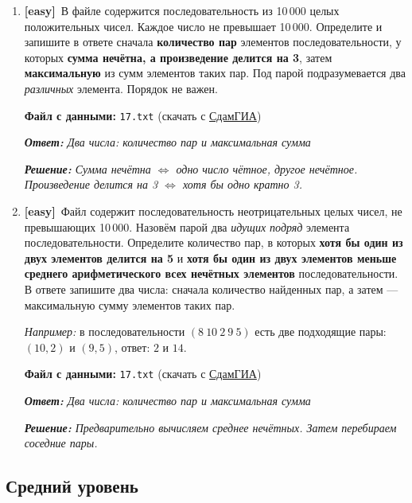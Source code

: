 \documentclass[a4paper]{article}
\newcommand{\easytag}{\textcolor{easycolor}{\textbf{[easy]}}}
\newcommand{\answer}[1]{\par\smallskip\textit{\textbf{Ответ:} #1}}
\newcommand{\solution}[1]{\par\textit{\textbf{Решение:} #1}}
\newcommand{\filehint}[1]{\par\smallskip\textbf{Файл с данными:} \texttt{#1} (скачать с \href{https://inf-ege.sdamgia.ru/}{СдамГИА})}
\begin{document}
\begin{enumerate}[label=\textbf{Задача \arabic*.}, leftmargin=*, itemsep=10mm]
  \bigskip

  \item %
  \easytag\ В файле содержится последовательность из 10\,000 целых положительных чисел.
  Каждое число не превышает 10\,000.
  Определите и запишите в ответе сначала \textbf{количество пар} элементов
  последовательности, у которых \textbf{сумма нечётна, а произведение делится на 3},
  затем \textbf{максимальную} из сумм элементов таких пар.
  Под парой подразумевается два \emph{различных} элемента. Порядок не важен.
  \filehint{17.txt}
  \answer{Два числа: количество пар и максимальная сумма}
  \solution{Сумма нечётна $\Leftrightarrow$ одно число чётное, другое нечётное. Произведение делится на 3 $\Leftrightarrow$ хотя бы одно кратно 3.}

  \bigskip

  \item %
  \easytag\ Файл содержит последовательность неотрицательных целых чисел, не превышающих
  10\,000. Назовём парой два \emph{идущих подряд} элемента последовательности.
  Определите количество пар, в которых \textbf{хотя бы один из двух элементов делится
  на 5} и \textbf{хотя бы один из двух элементов меньше среднего арифметического всех
  нечётных элементов} последовательности. В ответе запишите два числа: сначала
  количество найденных пар, а затем — максимальную сумму элементов таких пар.

  \textit{Например:} в последовательности $(8\ 10\ 2\ 9\ 5)$ есть две подходящие
  пары: $(10, 2)$ и $(9, 5)$, ответ: $2$ и $14$.
  \filehint{17.txt}
  \answer{Два числа: количество пар и максимальная сумма}
  \solution{Предварительно вычисляем среднее нечётных. Затем перебираем соседние пары.}

\end{enumerate}

\bigskip


\subsection*{\textcolor{medcolor}{Средний уровень}}
\end{document}
